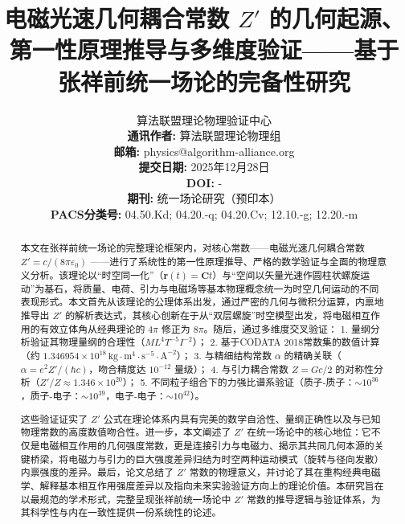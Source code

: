 \documentclass[a4paper,12pt]{article}
\theoremstyle{plain}
\renewcommand{\vec}[1]{\bm{#1}}
\begin{document}
\title{电磁光速几何耦合常数 $Z'$ 的几何起源、第一性原理推导与多维度验证——基于张祥前统一场论的完备性研究}
\author{
    算法联盟理论物理验证中心 \\ 
    \textbf{通讯作者:} 算法联盟理论物理组 \\ 
    \textbf{邮箱:} physics@algorithm-alliance.org \\ 
    \textbf{提交日期:} 2025年12月28日 \\ 
    \textbf{DOI:} - \\ 
    \textbf{期刊:} 统一场论研究（预印本） \\ 
    \textbf{PACS分类号:} 04.50.Kd; 04.20.-q; 04.20.Cv; 12.10.-g; 12.20.-m
}
\maketitle

\begin{abstract}
本文在张祥前统一场论的完整理论框架内，对核心常数——电磁光速几何耦合常数 $Z' = c/(8\pi\varepsilon_0)$ ——进行了系统性的第一性原理推导、严格的数学验证与全面的物理意义分析。该理论以“时空同一化”（$\vec{r}(t) = \vec{C}t$）与“空间以矢量光速作圆柱状螺旋运动”为基石，将质量、电荷、引力与电磁场等基本物理概念统一为时空几何运动的不同表现形式。本文首先从该理论的公理体系出发，通过严密的几何与微积分运算，内禀地推导出 $Z'$ 的解析表达式，其核心创新在于从“双层螺旋”时空模型出发，将电磁相互作用的有效立体角从经典理论的 $4\pi$ 修正为 $8\pi$。随后，通过多维度交叉验证：
1. 量纲分析验证其物理量纲的合理性（$M L^4 T^{-5} I^{-2}$）；
2. 基于CODATA 2018常数集的数值计算（约 $1.346954\times10^{18} \, \text{kg} \cdot \text{m}^4 \cdot \text{s}^{-5} \cdot \text{A}^{-2}$）；
3. 与精细结构常数 $\alpha$ 的精确关联（$\alpha = e^2Z'/(\hbar c)$，吻合精度达 $10^{-12}$ 量级）；
4. 与引力耦合常数 $Z = Gc/2$ 的对称性分析（$Z'/Z \approx 1.346\times10^{20}$）；
5. 不同粒子组合下的力强比谱系验证（质子-质子：$\sim10^{36}$，质子-电子：$\sim10^{39}$，电子-电子：$\sim10^{42}$）。

这些验证证实了 $Z'$ 公式在理论体系内具有完美的数学自洽性、量纲正确性以及与已知物理常数的高度数值吻合性。进一步，本文阐述了 $Z'$ 在统一场论中的核心地位：它不仅是电磁相互作用的几何强度常数，更是连接引力与电磁力、揭示其共同几何本源的关键桥梁，将电磁力与引力的巨大强度差异归结为时空两种运动模式（旋转与径向发散）内禀强度的差异。最后，论文总结了 $Z'$ 常数的物理意义，并讨论了其在重构经典电磁学、解释基本相互作用强度差异以及指向未来实验验证方向上的理论价值。本研究旨在以最规范的学术形式，完整呈现张祥前统一场论中 $Z'$ 常数的推导逻辑与验证体系，为其科学性与内在一致性提供一份系统性的论述。
\end{abstract}
\end{document}
